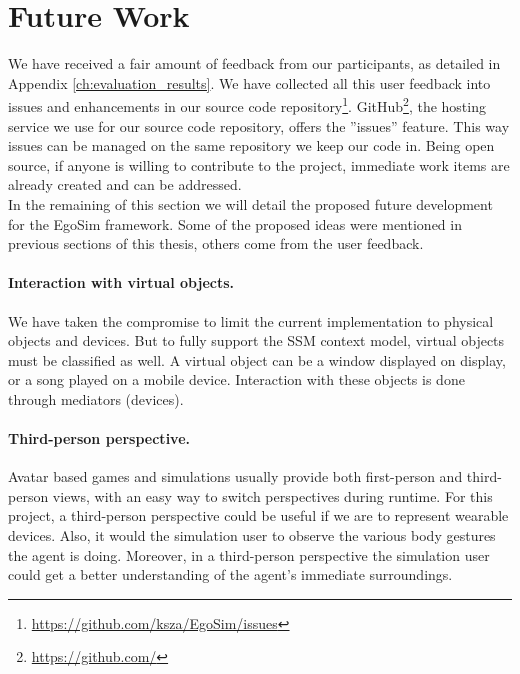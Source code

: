 \section{Future Work} %
\label{sec:eval_future_work}
We have received a fair amount of feedback from our participants, as detailed in Appendix \ref{ch:evaluation_results}. We have collected all this user feedback into issues and enhancements in our source code repository\footnote{\url{https://github.com/ksza/EgoSim/issues}}. GitHub\footnote{\url{https://github.com/}}, the hosting service we use for our source code repository, offers the ''issues'' feature. This way issues can be managed on the same repository we keep our code in. Being open source, if anyone is willing to contribute to the project, immediate work items are already created and can be addressed.\\

In the remaining of this section we will detail the proposed future development for the EgoSim framework. Some of the proposed ideas were mentioned in previous sections of this thesis, others come from the user feedback.\\

\paragraph{Interaction with virtual objects.} We have taken the compromise to limit the current implementation to physical objects and devices. But to fully support the SSM context model, virtual objects must be classified as well. A virtual object can be a window displayed on display, or a song played on a mobile device. Interaction with these objects is done through mediators (devices).

\paragraph{Third-person perspective.} Avatar based games and simulations usually provide both first-person and third-person views, with an easy way to switch perspectives during runtime. For this project, a third-person perspective could be useful if we are to represent wearable devices. Also, it would the simulation user to observe the various body gestures the agent is doing. Moreover, in a third-person perspective the simulation user could get a better understanding of the agent's immediate surroundings.


